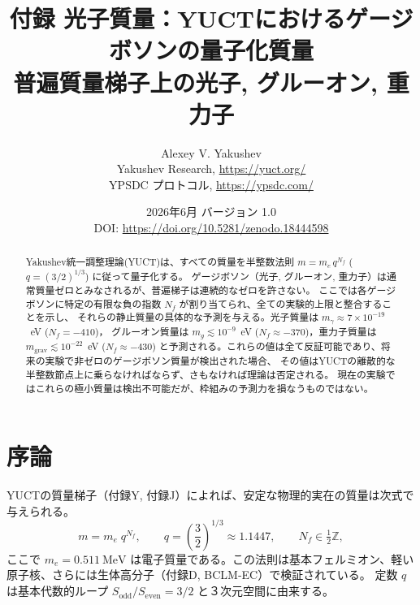 \documentclass[11pt,a4paper]{article}
\begin{document}
	
	\title{\Huge\textbf{付録 光子質量：YUCTにおけるゲージボソンの量子化質量}\\[0.3cm]
		\Large 普遍質量梯子上の光子, グルーオン, 重力子}
	
	\author{Alexey V. Yakushev \\ 
		Yakushev Research, \url{https://yuct.org/} \\ 
		YPSDC プロトコル, \url{https://ypsdc.com/}}
	
	\date{2026年6月 \quad バージョン 1.0 \\ \medskip
		DOI: \url{https://doi.org/10.5281/zenodo.18444598}}
	
	\maketitle
	
	\begin{abstract}
		Yakushev統一調整理論(YUCT)は、すべての質量を半整数法則 $m = m_e \, q^{N_f}$ ($q = (3/2)^{1/3}$) に従って量子化する。
		ゲージボソン（光子, グルーオン, 重力子）は通常質量ゼロとみなされるが、普遍梯子は連続的なゼロを許さない。
		ここでは各ゲージボソンに特定の有限な負の指数 $N_f$ が割り当てられ、全ての実験的上限と整合することを示し、
		それらの静止質量の具体的な予測を与える。光子質量は $m_\gamma \approx 7\times 10^{-19}$~eV ($N_f = -410$)，
		グルーオン質量は $m_g \lesssim 10^{-9}$~eV ($N_f \approx -370$)，重力子質量は $m_{\mathrm{grav}} \lesssim 10^{-22}$~eV
		($N_f \approx -430$) と予測される。これらの値は全て反証可能であり、将来の実験で非ゼロのゲージボソン質量が検出された場合、
		その値はYUCTの離散的な半整数節点上に乗らなければならず、さもなければ理論は否定される。
		現在の実験ではこれらの極小質量は検出不可能だが、枠組みの予測力を損なうものではない。
	\end{abstract}
	
	\newpage
	\tableofcontents
	\newpage
	
	\section{序論}
	
	YUCTの質量梯子（付録Y, 付録J）によれば、安定な物理的実在の質量は次式で与えられる。
	\begin{equation}\label{eq:massladder}
		m = m_e \; q^{N_f}, \qquad q = \left(\frac{3}{2}\right)^{\!1/3} \approx 1.1447,
		\qquad N_f \in \tfrac12\mathbb{Z},
	\end{equation}
	ここで $m_e = 0.511~\mathrm{MeV}$ は電子質量である。この法則は基本フェルミオン、軽い原子核、さらには生体高分子（付録D, BCLM‑EC）で検証されている。
	定数 $q$ は基本代数的ループ $S_{\mathrm{odd}}/S_{\mathrm{even}} = 3/2$ と３次元空間に由来する。
	
\end{document}
